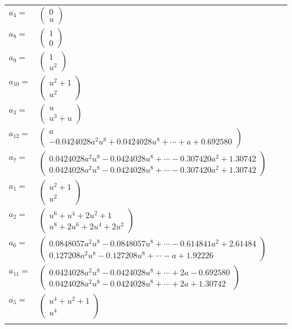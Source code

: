 \documentclass[1p]{elsarticle_modified}
\theoremstyle{definition}
\begin{document}
\begin{tabular}{m{7pt} m{180pt} m{7pt} m{180pt} }
\flushright $a_{4}=$&$\begin{pmatrix}0\\u\end{pmatrix}$ \\
\flushright $a_{8}=$&$\begin{pmatrix}1\\0\end{pmatrix}$ \\
\flushright $a_{9}=$&$\begin{pmatrix}1\\u^2\end{pmatrix}$ \\
\flushright $a_{10}=$&$\begin{pmatrix}u^2+1\\u^2\end{pmatrix}$ \\
\flushright $a_{3}=$&$\begin{pmatrix}u\\u^3+u\end{pmatrix}$ \\
\flushright $a_{12}=$&$\begin{pmatrix}a\\-0.0424028 a^{2} u^{8}+0.0424028 u^{8}+\cdots+a+0.692580\end{pmatrix}$ \\
\flushright $a_{7}=$&$\begin{pmatrix}0.0424028 a^{2} u^{8}-0.0424028 u^{8}+\cdots-0.307420 a^{2}+1.30742\\0.0424028 a^{2} u^{8}-0.0424028 u^{8}+\cdots-0.307420 a^{2}+1.30742\end{pmatrix}$ \\
\flushright $a_{1}=$&$\begin{pmatrix}u^2+1\\u^2\end{pmatrix}$ \\
\flushright $a_{2}=$&$\begin{pmatrix}u^6+u^4+2 u^2+1\\u^8+2 u^6+2 u^4+2 u^2\end{pmatrix}$ \\
\flushright $a_{6}=$&$\begin{pmatrix}0.0848057 a^{2} u^{8}-0.0848057 u^{8}+\cdots-0.614841 a^{2}+2.61484\\0.127208 a^{2} u^{8}-0.127208 u^{8}+\cdots-a+1.92226\end{pmatrix}$ \\
\flushright $a_{11}=$&$\begin{pmatrix}0.0424028 a^{2} u^{8}-0.0424028 u^{8}+\cdots+2 a-0.692580\\0.0424028 a^{2} u^{8}-0.0424028 u^{8}+\cdots+2 a+1.30742\end{pmatrix}$ \\
\flushright $a_{5}=$&$\begin{pmatrix}u^4+u^2+1\\u^4\end{pmatrix}$\\&\end{tabular}
\end{document}
